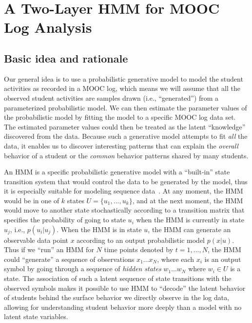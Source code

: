 \section{A Two-Layer HMM for MOOC Log Analysis}

\subsection{Basic idea and rationale} 

Our general idea is to use a probabilistic generative model to model 
the student activities as recorded in a MOOC log, which means we will 
assume that all the observed student activities are samples drawn (i.e., ``generated'') from 
a parameterized probabilistic model. We can then estimate the 
parameter values of the probabilistic model by fitting the model to a specific
MOOC log data set. The estimated parameter values could then be treated as 
the latent ``knowledge'' discovered from the data. Because such a generative model 
attempts to fit {\em all} the data, it enables us to discover interesting patterns
that can explain the {\em overall} behavior of a student or the {\em common} behavior patterns shared by many students. 

An HMM  is a specific probabilistic generative model with a ``built-in'' state transition system
that would control the data to be generated by the model, thus it is especially 
suitable for modeling sequence data~\cite{Rabiner:1990:RSR, Huang:1990:HMM}. At any moment, the HMM would be in 
one of $k$ states $U=\{u_1, ...,u_k\}$, and at the next moment, the HMM would move to 
another state stochastically according to a transition matrix that specifies the probability of
going to state $u_i$ when the HMM is currently in state $u_j$, i.e., $p(u_i|u_j)$. 
When the HMM is in state $u$, the HMM can generate an observable data point $x$ 
according to an output probabilistic model $p(x|u)$. Thus if we ``run'' an HMM for 
$N$ time points denoted by $t=1, ..., N$, the HMM could ``generate'' a sequence of 
observations $x_1 ... x_N$, where each $x_i$ is an output symbol by 
going through a sequence of {\em hidden states} $w_1 ... w_N$ where $w_i \in U$ is a state. 
The association of such a latent sequence of state transitions with the observed symbols makes
it possible to use HMM to ``decode'' the latent behavior of students behind the surface behavior we directly observe in the log data, allowing for understanding student behavior more deeply than a model with no latent state variables. 

